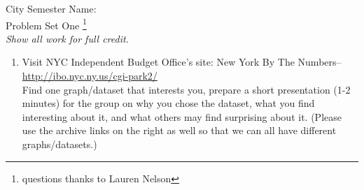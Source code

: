 \documentclass[12pt]{article}
\theoremstyle{plain}     %
\begin{document}
\large
City Semester  \hspace{8cm} Name:\makebox[6cm]{\hrulefill}
\\
Problem Set One \footnote{questions thanks to Lauren Nelson}\\
\normalsize 
\emph{Show all work for full credit.}\\
\begin{enumerate}
	\item Visit NYC Independent Budget Office's site: New York By The Numbers--\url{http://ibo.nyc.ny.us/cgi-park2/}\\
	Find one graph/dataset that interests you, prepare a short presentation (1-2 minutes) for the group on why you chose the dataset, what you find interesting about it, and what others may find surprising about it. (Please use the archive links on the right as well so that we can all have different graphs/datasets.)\\
	

\end{enumerate}
\end{document}

